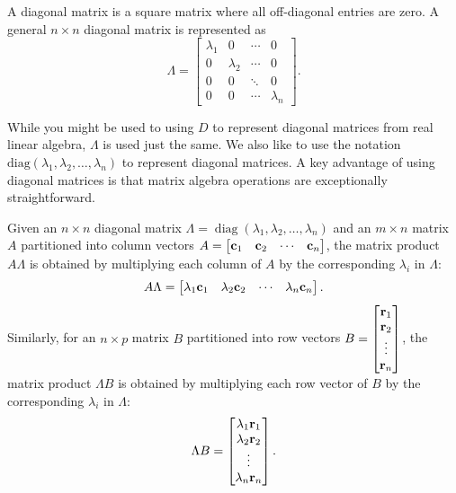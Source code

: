 \documentclass[12pt]{article}
\begin{document}
\begin{definition}
    A diagonal matrix is a square matrix where all off-diagonal entries are zero. A general $n \times n$ diagonal matrix is represented as
    \[
        \Lambda =
        \begin{bmatrix}
        \lambda_{1} & 0           & \cdots & 0 \\
        0           & \lambda_{2} & \cdots & 0 \\
        0           & 0           & \ddots & 0 \\
        0           & 0           & \cdots & \lambda_{n}
        \end{bmatrix}.
    \]
\end{definition}

While you might be used to using $D$ to represent diagonal matrices from real linear algebra, $\Lambda$ is used just the same. We also like to use the notation $\text{diag}(\lambda_1, \lambda_2, \ldots, \lambda_n)$ to represent diagonal matrices. A key advantage of using diagonal matrices is that matrix algebra operations are exceptionally straightforward. 

\begin{theorem}
    Given an $n \times n$ diagonal matrix $\Lambda = \operatorname{diag}(\lambda_{1}, \lambda_{2}, \ldots, \lambda_{n})$ and an $m \times n$ matrix $A$ partitioned into column vectors $A = \begin{bmatrix} \mathbf{c}_{1} & \mathbf{c}_{2} & \cdots & \mathbf{c}_{n} \end{bmatrix}$, the matrix product $A\Lambda$ is obtained by multiplying each column of $A$ by the corresponding $\lambda_{i}$ in $\Lambda$:
    \[
        A\Lambda = \begin{bmatrix} \lambda_{1}\mathbf{c}_{1} & \lambda_{2}\mathbf{c}_{2} & \cdots & \lambda_{n}\mathbf{c}_{n} \end{bmatrix}.
    \]
    Similarly, for an $n \times p$ matrix $B$ partitioned into row vectors $B = \begin{bmatrix} \mathbf{r}_{1} \\ \mathbf{r}_{2} \\ \vdots \\ \mathbf{r}_{n} \end{bmatrix}$, the matrix product $\Lambda B$ is obtained by multiplying each row vector of $B$ by the corresponding $\lambda_{i}$ in $\Lambda$:
    \[
        \Lambda B =
        \begin{bmatrix}
        \lambda_{1}\mathbf{r}_{1} \\
        \lambda_{2}\mathbf{r}_{2} \\
        \vdots \\
        \lambda_{n}\mathbf{r}_{n}
        \end{bmatrix}.
    \]
\end{theorem}
\end{document}
